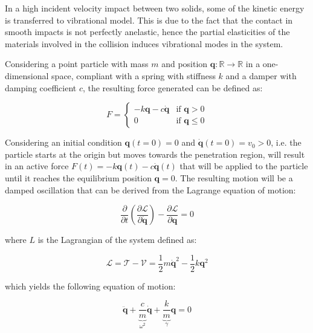 In a high incident velocity impact between two solids, some of the kinetic energy is transferred to vibrational model. This is due to the fact that the contact in smooth impacts is not perfectly anelastic, hence the partial elasticities of the materials involved in the collision induces vibrational modes in the system.

Considering a point particle with mass $m$ and position $\mathbf{q} : \mathbb{R} \rightarrow \mathbb{R}$ in a one-dimensional space, compliant with a spring with stiffness $k$ and a damper with damping coefficient $c$, the resulting force generated can be defined as:

\begin{equation}
    F = \begin{cases}
        -k\mathbf{q} - c\dot{\mathbf{q}} & \text{if } \mathbf{q} > 0    \\
        0                                & \text{if } \mathbf{q} \leq 0
    \end{cases}
\end{equation}

Considering an initial condition $\mathbf{q}(t=0) = 0$ and $\dot{\mathbf{q}}(t=0) = v_0 > 0$, i.e. the particle starts at the origin but moves towards the penetration region, will result in an active force $F(t) = -k\mathbf{q}(t) - c\dot{\mathbf{q}}(t)$ that will be applied to the particle until it reaches the equilibrium position $\mathbf{q} = 0$. The resulting motion will be a damped oscillation that can be derived from the Lagrange equation of motion:

\begin{equation}
    \frac{\partial}{\partial t} \left( \frac{\partial \mathcal{L}}{\partial \dot{\mathbf{q}}} \right) - \frac{\partial \mathcal{L}}{\partial \mathbf{q}} = 0
\end{equation}

where $L$ is the Lagrangian of the system defined as:

\begin{equation}
    \mathcal{L} = \mathcal{T} - \mathcal{V} = \frac{1}{2}m\dot{\mathbf{q}}^2 - \frac{1}{2}k\mathbf{q}^2
\end{equation}

which yields the following equation of motion:

\begin{equation}
    \ddot{\mathbf{q}} + \underbrace{\frac{c}{m}} _{\omega ^2} \dot{\mathbf{q}} + \underbrace{\frac{k}{m}} _\gamma \mathbf{q} = 0
\end{equation}

